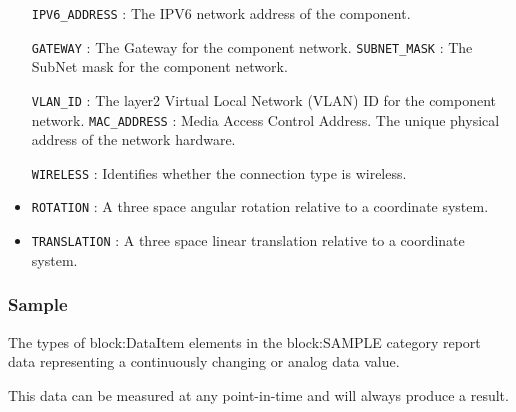 \begin{itemize}
\newline\tab \texttt{IPV6_ADDRESS} : The IPV6 network address of the component.
 
\newline\tab \texttt{GATEWAY} : The Gateway for the component network. 
\newline\tab \texttt{SUBNET_MASK} : The SubNet mask for the component network.
 
\newline\tab \texttt{VLAN_ID} : The layer2 Virtual Local Network (VLAN) ID for the component network. 
\newline\tab \texttt{MAC_ADDRESS} : Media Access Control Address. The unique physical address of the network hardware.
 
\newline\tab \texttt{WIRELESS} : Identifies whether the connection type is wireless. 
\item \texttt{ROTATION} : A three space angular rotation relative to a coordinate system. 

\item \texttt{TRANSLATION} : A three space linear translation relative to a coordinate system. 

\end{itemize}

\FloatBarrier

\subsubsection{Sample}
  \label{sec:Sample}


The types of {block:DataItem} elements in the {block:SAMPLE} category report data representing a continuously changing or analog data value.

This data can be measured at any point-in-time and will always produce a result.


